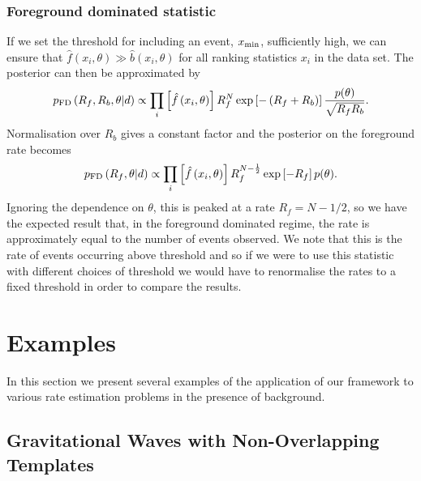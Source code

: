 \documentclass[aps,prd]{revtex4-1}
\begin{document}
\subsubsection{Foreground dominated statistic}
If we set the threshold for including an event, $x_{\rm min}$,
sufficiently high, we can ensure that $\hat{f}(x_i,\theta) \gg
\hat{b}(x_i,\theta)$ for all ranking statistics $x_i$ in the data
set. The posterior can then be approximated by
\begin{equation}
p_{\rm FD}\left( R_f, R_b, \theta | d \right) \propto \prod_{i} \left[
  \hat{f}\left(x_i, \theta\right)\right] R_f^N \exp\left[-\left( R_f +
  R_b \right) \right] \frac{p(\theta)}{\sqrt{R_f R_b}}.
\end{equation}
Normalisation over $R_b$ gives a constant factor and the posterior on
the foreground rate becomes
\begin{equation}
p_{\rm FD}\left( R_f, \theta | d \right) \propto \prod_{i} \left[
  \hat{f}\left(x_i, \theta\right)\right] R_f^{N-\frac{1}{2}}
\exp\left[-R_f \right] p(\theta).
\end{equation}
Ignoring the dependence on $\theta$, this is peaked at a rate $R_f =
N-1/2$, so we have the expected result that, in the foreground
dominated regime, the rate is approximately equal to the number of
events observed. We note that this is the rate of events occurring
above threshold and so if we were to use this statistic with different
choices of threshold we would have to renormalise the rates to a fixed
threshold in order to compare the results.

\section{Examples}
\label{sec:GW-example}

In this section we present several examples of the application of our
framework to various rate estimation problems in the presence of
background.

\subsection{Gravitational Waves with Non-Overlapping Templates}
\label{sec:analytic-GW-example}
\end{document}
